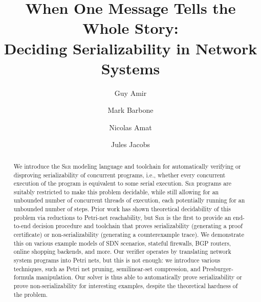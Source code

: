 \documentclass[a4paper]{llncs}
\title{When One Message Tells the Whole Story:\\ Deciding Serializability in Network Systems}
\author{
			Guy Amir \and
			Mark Barbone \and
			Nicolas Amat \and
			Jules Jacobs
		}
\institute{}
\newcommand{\toolname}{\textsc{Ser}}
\let\oldmaketitle\maketitle
\renewcommand{\maketitle}{
  \oldmaketitle
  \pagestyle{plain}  %
  \thispagestyle{plain}  %
}
\begin{document}
%	

\maketitle

\begin{abstract}
	We introduce the \toolname{} modeling language and toolchain for automatically verifying or disproving serializability of concurrent programs, i.e., whether every concurrent execution of the program is equivalent to some serial execution. \toolname{} programs are suitably restricted to make this problem decidable, while still allowing for an unbounded number of concurrent threads of execution, each potentially running for an unbounded number of steps.
	Prior work has shown theoretical decidability of this problem via reductions to Petri-net reachability, but \toolname{} is the first to provide an end-to-end decision procedure and toolchain that proves serializability (generating a proof certificate) or non-serializability (generating a counterexample trace).
	We demonstrate this on various example models of SDN scenarios, stateful firewalls, BGP routers, online shopping backends, and more.
	Our verifier operates by translating network system programs into Petri nets, but this is not enough: we introduce various techniques, such as Petri net pruning, semilinear-set compression, and Presburger-formula manipulation.
	Our solver is thus able to automatically prove serializability or prove non-serializability for interesting examples, despite the theoretical hardness of the problem.
\end{abstract}












\newpage

{
	
	
}

\newpage







\end{document}
